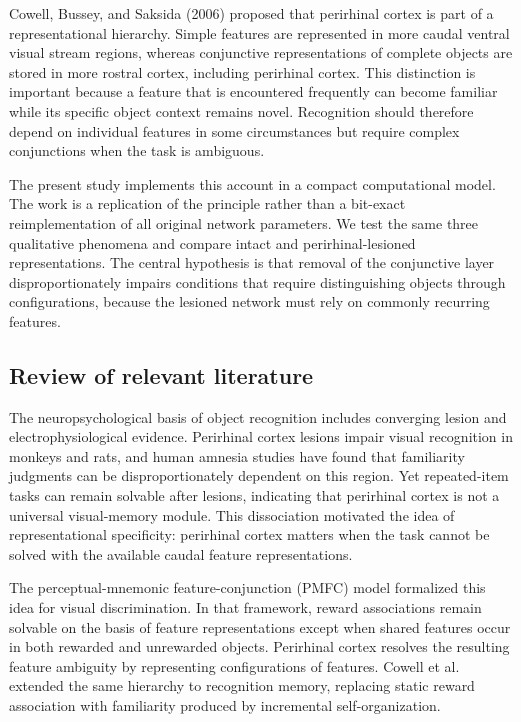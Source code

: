 \documentclass[11pt]{article}
\begin{document}
Cowell, Bussey, and Saksida (2006) proposed that perirhinal cortex is part of a representational hierarchy. Simple features are represented in more caudal ventral visual stream regions, whereas conjunctive representations of complete objects are stored in more rostral cortex, including perirhinal cortex. This distinction is important because a feature that is encountered frequently can become familiar while its specific object context remains novel. Recognition should therefore depend on individual features in some circumstances but require complex conjunctions when the task is ambiguous.

The present study implements this account in a compact computational model. The work is a replication of the principle rather than a bit-exact reimplementation of all original network parameters. We test the same three qualitative phenomena and compare intact and perirhinal-lesioned representations. The central hypothesis is that removal of the conjunctive layer disproportionately impairs conditions that require distinguishing objects through configurations, because the lesioned network must rely on commonly recurring features.

\subsection{Review of relevant literature}
The neuropsychological basis of object recognition includes converging lesion and electrophysiological evidence. Perirhinal cortex lesions impair visual recognition in monkeys and rats, and human amnesia studies have found that familiarity judgments can be disproportionately dependent on this region. Yet repeated-item tasks can remain solvable after lesions, indicating that perirhinal cortex is not a universal visual-memory module. This dissociation motivated the idea of representational specificity: perirhinal cortex matters when the task cannot be solved with the available caudal feature representations.

The perceptual-mnemonic feature-conjunction (PMFC) model formalized this idea for visual discrimination. In that framework, reward associations remain solvable on the basis of feature representations except when shared features occur in both rewarded and unrewarded objects. Perirhinal cortex resolves the resulting feature ambiguity by representing configurations of features. Cowell et al. extended the same hierarchy to recognition memory, replacing static reward association with familiarity produced by incremental self-organization.
\end{document}
